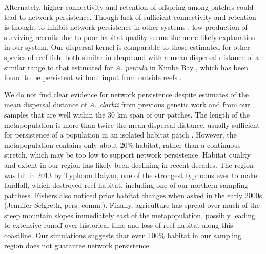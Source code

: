 \documentclass[12pt, oneside]{article}   	%
\begin{document}
Alternately, higher connectivity and retention of offspring among patches could lead to network persistence. Though lack of sufficient connectivity and retention is thought to inhibit network persistence in other systems \citep[e.g., a collection of reserves for eastern oysters (\textit{Crassostrea virginica}) in the Pamlico Sound in North Carolina;][]{puckett2016metapopulation}, low production of surviving recruits due to poor habitat quality seems the more likely explanation in our system. Our dispersal kernel is comparable to those estimated for other species of reef fish, both similar in shape \citep[e.g.,][]{harrison2012larval, daloia2015patterns} and with a mean dispersal distance of a similar range to that estimated for \textit{A. percula} in Kimbe Bay \citep[13.3 and 18.9 km compared to our estimate of 8.2 km;][]{almany2017larval}, which has been found to be persistent without input from outside reefs \citep{salles_coral_2015}. 

We do not find clear evidence for network persistence despite estimates of the mean dispersal distance of \textit{A. clarkii} from previous genetic work \citep[9 km,][]{pinsky2010using} and from our samples \citep[8.2 km,][]{catalanoInPrepconnectivity} that are well within the 30 km span of our patches. The length of the metapopulation is more than twice the mean dispersal distance, usually sufficient for persistence of a population in an isolated habitat patch \citep[e.g.,][]{lockwood2002effects}. However, the metapopulation contains only about 20\% habitat, rather than a continuous stretch, which may be too low to support network persistence. Habitat quality and extent in our region has likely been declining in recent decades. The region was hit in 2013 by Typhoon Haiyan, one of the strongest typhoons ever to make landfall, which destroyed reef habitat, including one of our northern sampling patchess. Fishers also noticed prior habitat changes when asked in the early 2000s (Jennifer Selgreth, pers. comm.). Finally, agriculture has spread over much of the steep mountain slopes immediately east of the metapopulation, possibly leading to extensive runoff over historical time and loss of reef habitat along this coastline. Our simulations suggests that even 100\% habitat in our sampling region does not guarantee network persistence.
\end{document}
